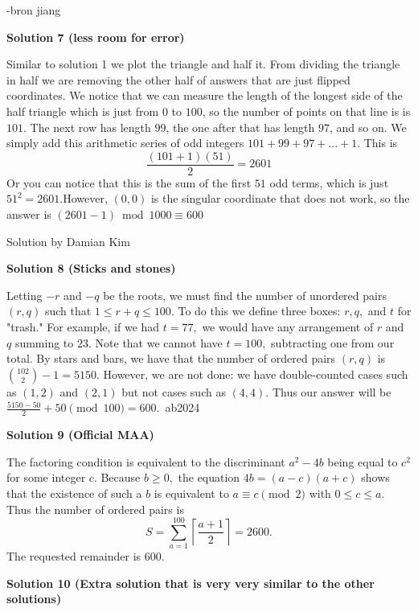 \begin{enumerate}
 -bron jiang

 



\textbf{Solution 7 (less room for error)}

Similar to solution 1 we plot the triangle and half it. From dividing the triangle in half we are removing the other half of answers that are just flipped coordinates. We notice that we can measure the length of the longest side of the half triangle which is just from $0$ to $100$, so the number of points on that line is is $101$. The next row has length $99$, the one after that has length $97$, and so on. We simply add this arithmetic series of odd integers $101+99+97+...+1$. This is 
 \[\frac{(101+1)(51)}{2} = 2601\] Or you can notice that this is the sum of the first $51$ odd terms, which is just $51^2 = 2601$.However, $(0,0)$ is the singular coordinate that does not work, so the answer is $(2601-1)\bmod {1000}\equiv\boxed{600}$

 Solution by Damian Kim~

 



\textbf{Solution 8 (Sticks and stones)}

Letting $-r$ and $-q$ be the roots, we must find the number of unordered pairs $(r,q)$ such that $1 \le r+q \le 100.$ To do this we define three boxes: $r, q,$ and $t$ for "trash." For example, if we had $t=77,$ we would have any arrangement of $r$ and $q$ summing to $23.$ Note that we cannot have $t=100,$ subtracting one from our total. By stars and bars, we have that the number of ordered pairs $(r,q)$ is ${102 \choose 2} - 1 = 5150.$ However, we are not done: we have double-counted cases such as $(1,2)$ and $(2,1)$ but not cases such as $(4,4).$ Thus our answer will be $\frac{5150 - 50}{2} + 50 \pmod {100} = \boxed{600}.$~ab2024

 



\textbf{Solution 9 (Official MAA)}

The factoring condition is equivalent to the discriminant $a^2-4b$ being equal to $c^2$ for some integer $c.$ Because $b\ge 0,$ the equation $4b=(a-c)(a+c)$ shows that the existence of such a $b$ is equivalent to $a\equiv c\pmod 2$ with $0\le c\le a.$ Thus the number of ordered pairs is 
 \[S=\sum_{a=1}^{100}\left\lceil\frac{a+1}{2}\right\rceil=2600.\] The requested remainder is $600.$




\textbf{Solution 10 (Extra solution that is very very similar to the other solutions)}


\end{enumerate}
